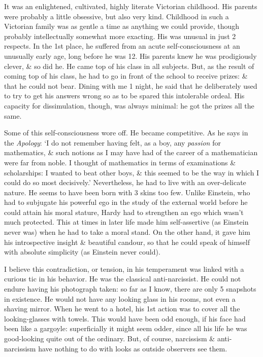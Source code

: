 \documentclass{article}
\numberwithin{equation}{section}
\begin{document}
It was an enlightened, cultivated, highly literate Victorian childhood. His parents were probably a little obsessive, but also very kind. Childhood in such a Victorian family was as gentle a time as anything we could provide, though probably intellectually somewhat more exacting. His was unusual in just 2 respects. In the 1st place, he suffered from an acute self-consciousness at an unusually early age, long before he was 12. His parents knew he was prodigiously clever, \& so did he. He came top of his class in all subjects. But, as the result of coming top of his class, he had to go in front of the school to receive prizes: \& that he could not bear. Dining with me 1 night, he said that he deliberately used to try to get his answers wrong so as to be spared this intolerable ordeal. His capacity for dissimulation, though, was always minimal: he got the prizes all the same.

Some of this self-consciousness wore off. He became competitive. As he says in the \textit{Apology}: `I do not remember having felt, as a boy, any \textit{passion} for mathematics, \& such notions as I may have had of the career of a mathematician were far from noble. I thought of mathematics in terms of examinations \& scholarships: I wanted to beat other boys, \& this seemed to be the way in which I could do so most decisively.' Nevertheless, he had to live with an over-delicate nature. He seems to have been born with 3 skins too few. Unlike Einstein, who had to subjugate his powerful ego in the study of the external world before he could attain his moral stature, Hardy had to strengthen an ego which wasn't much protected. This at times in later life made him self-assertive (as Einstein never was) when he had to take a moral stand. On the other hand, it gave him his introspective insight \& beautiful candour, so that he could speak of himself with absolute simplicity (as Einstein never could).

I believe this contradiction, or tension, in his temperament was linked with a curious tic in his behavior. He was the classical anti-narcissist. He could not endure having his photograph taken: so far as I know, there are only 5 snapshots in existence. He would not have any looking glass in his rooms, not even a shaving mirror. When he went to a hotel, his 1st action was to cover all the looking-glasses with towels. This would have been odd enough, if his face had been like a gargoyle: superficially it might seem odder, since all his life he was good-looking quite out of the ordinary. But, of course, narcissism \& anti-narcissism have nothing to do with looks as outside observers see them.
\end{document}
